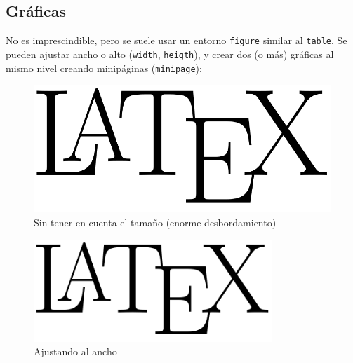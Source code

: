 \documentclass[12pt]{article}
\begin{document}
	\subsection{Gráficas}
	No es imprescindible, pero se suele usar un entorno \texttt{figure} similar al \texttt{table}. Se pueden ajustar ancho o alto (\texttt{width}, \texttt{heigth}), y crear dos (o más) gráficas al mismo nivel creando minipáginas (\texttt{minipage}):
	\begin{figure}[h]
		\begin{center}
			\includegraphics{latex_logo.png}
			\caption{Sin tener en cuenta el tamaño (enorme desbordamiento)}
		\end{center}
	\end{figure}
	\begin{figure}[h]
		\begin{center}
			\includegraphics[width=0.8\textwidth]{latex_logo.png}
			\caption{Ajustando al ancho}
		\end{center}
	\end{figure}
\end{document}
